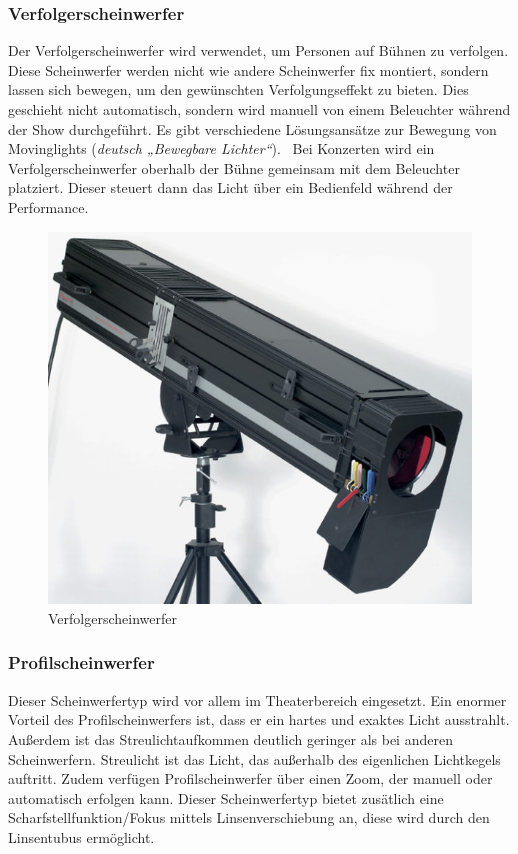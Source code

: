\subsubsection{Verfolgerscheinwerfer}
Der Verfolgerscheinwerfer wird verwendet, um Personen auf Bühnen zu verfolgen. Diese Scheinwerfer werden nicht wie andere Scheinwerfer fix montiert, sondern lassen sich bewegen, um den gewünschten Verfolgungseffekt zu bieten. Dies geschieht nicht automatisch, sondern wird manuell von einem Beleuchter während der Show durchgeführt. Es gibt verschiedene Lösungsansätze zur Bewegung von Movinglights (\emph{deutsch „Bewegbare Lichter“}). \ Bei Konzerten wird ein Verfolgerscheinwerfer oberhalb der Bühne gemeinsam mit dem Beleuchter platziert. Dieser steuert dann das Licht über ein Bedienfeld während der Performance.\\
\textcite{Verfolgerscheinwerfer}

\begin{figure}[H]
	\centering
	\includegraphics[width=0.7\linewidth]{images/Verfolgerscheinwerfer.jpg}
	\caption[Verfolgerscheinwerfer]{Verfolgerscheinwerfer}
	\label{fig:Verfolgerscheinwerfer}
\end{figure}

\subsubsection{Profilscheinwerfer}
Dieser Scheinwerfertyp wird vor allem im Theaterbereich eingesetzt. Ein enormer Vorteil des Profilscheinwerfers ist, dass er ein hartes und exaktes Licht ausstrahlt. Außerdem ist das Streulichtaufkommen deutlich geringer als bei anderen Scheinwerfern. Streulicht ist das Licht, das außerhalb des eigenlichen Lichtkegels auftritt. Zudem verfügen Profilscheinwerfer über einen Zoom, der manuell oder automatisch erfolgen kann. Dieser Scheinwerfertyp bietet zusätlich eine Scharfstellfunktion/Fokus mittels Linsenverschiebung an, diese wird durch den Linsentubus ermöglicht.\\
\textcite{Profilscheinwerfer}

